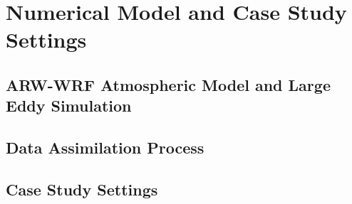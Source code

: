 \section{Numerical Model and Case Study Settings}
\subsection{ARW-WRF Atmospheric Model and Large Eddy Simulation}
\subsection{Data Assimilation Process}
\subsection{Case Study Settings}








